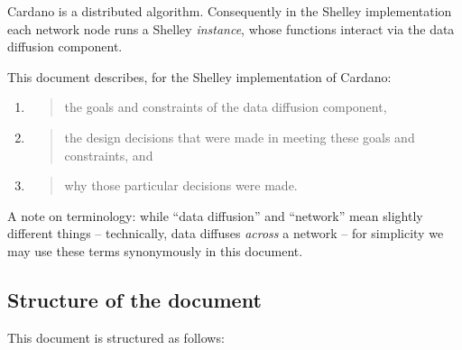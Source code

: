 \documentclass[11pt,a4paper]{article}
\begin{document}
Cardano is a distributed algorithm. Consequently in the Shelley
implementation each network node runs a Shelley \emph{instance}, whose
functions interact via the data diffusion component.

This document describes, for the Shelley implementation of Cardano:

\begin{enumerate}
\def\labelenumi{\arabic{enumi}.}
\item
  \begin{quote}
  the goals and constraints of the data diffusion component,
  \end{quote}
\item
  \begin{quote}
  the design decisions that were made in meeting these goals and
  constraints, and
  \end{quote}
\item
  \begin{quote}
  why those particular decisions were made.
  \end{quote}
\end{enumerate}

A note on terminology: while ``data diffusion'' and ``network'' mean
slightly different things -- technically, data diffuses \emph{across} a
network -- for simplicity we may use these terms synonymously in this
document.

\subsection{Structure of the document}
\label{structure-of-the-document}


This document is structured as follows:
\end{document}
